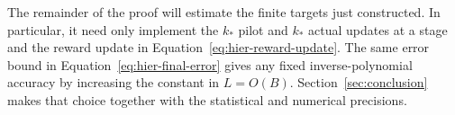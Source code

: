 The remainder of the proof will estimate the finite targets just
constructed.  In particular, it need only implement the $k_*$ pilot and
$k_*$ actual updates at a stage and the reward update in
Equation~\eqref{eq:hier-reward-update}.
The same error bound in Equation~\eqref{eq:hier-final-error} gives any
fixed inverse-polynomial accuracy by increasing the constant in
$L=O(B)$.  Section~\ref{sec:conclusion} makes that choice together with
the statistical and numerical precisions.
